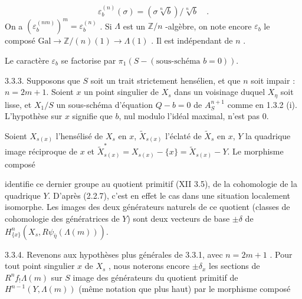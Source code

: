 \begin{equation*}
\varepsilon_b^{(n)}(\sigma) = (\sigma \sqrt[n]{b})/ \sqrt[n]{b} \quad .
\end{equation*}
On a $(\varepsilon_b^{(nm)})^m=\varepsilon_b^{(n)}$ . Si $\Lambda$ est un $\mathbb{Z}/n$ -algèbre, on note encore $\varepsilon_b$ le composé $\mathrm{Gal}\longrightarrow \mathbb{Z}/(n)(1)\longrightarrow \Lambda(1)$ . Il est indépendant de $n$ .

Le caractère $\varepsilon_b$ se factorise par $\pi_1(S-(\text{sous-schéma } b=0))$.

3.3.3. Supposons que $S$ soit un trait strictement hensélien, et que $n$ soit impair : $n=2m+1$. Soient $x$ un point singulier de $X_s$ dans un voisinage duquel $X_\eta$ soit lisse, et $X_1/S$ un sous-schéma d'équation $Q-b=0$ de $A^{n+1}_S$ comme en 1.3.2 (i). L'hypothèse sur $x$ signifie que $b$, nul modulo l'idéal maximal, n'est pas 0.

Soient $X_{s(x)}$ l'hensélisé de $X_s$ en $x$, $\widetilde{X}_{s(x)}$ l'éclaté de $\widetilde{X}_s$ en $x$, $Y$ la quadrique image réciproque de $x$ et $\widetilde{X}^{*}_{s(x)}=X_{s(x)}-\{x\}=\widetilde{X}_{s(x)}-Y$. Le morphisme composé

\begin{center}
\end{center}
identifie ce dernier groupe au quotient primitif (XII 3.5), de la cohomologie de la quadrique $Y$. D'après (2.2.7), c'est en effet le cas dans une situation localement isomorphe. Les images des deux générateurs naturels de ce quotient (classes de cohomologie des génératrices de $Y$) sont deux vecteurs de base $\pm\delta$ de $H^n_{\{x\}}(X_s,R\psi_{\bar\eta}(\Lambda(m)))$.



3.3.4.  Revenons aux hypothèses plus générales de 3.3.1, avec $n = 2m + 1$ . Pour tout point singulier $x$ de $X_s$ , nous noterons encore $\pm \delta_x$ les sections de $R^n f_! \Lambda(m)$ sur $S$ image des générateurs du quotient primitif de $H^{n-1}(Y,\Lambda(m))$ (même notation que plus haut) par le morphisme composé


